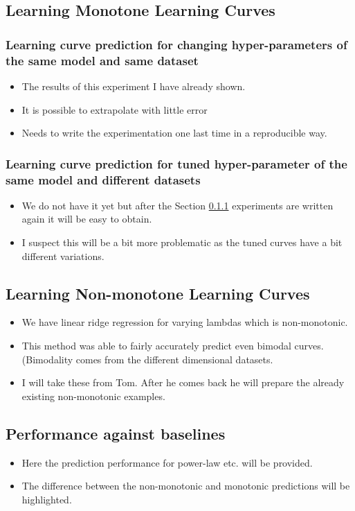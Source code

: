 \subsection{Learning Monotone Learning Curves}

\subsubsection{Learning curve prediction for changing hyper-parameters of the same model and same dataset}\label{sec:same}
\begin{itemize}
  \item The results of this experiment I have already shown. 
  \item It is possible to extrapolate with little error
  \item Needs to write the experimentation one last time in a reproducible way.
\end{itemize}
\subsubsection{Learning curve prediction for tuned hyper-parameter of the same model and different datasets}\label{sec:diff-dataset}
\begin{itemize}
  \item We do not have it yet but after the Section \ref{sec:same} experiments are written again it will be easy to obtain.
  \item I suspect this will be a bit more problematic as the tuned curves have a bit different variations.
\end{itemize}

\subsection{Learning Non-monotone Learning Curves}
\begin{itemize}
  \item We have linear ridge regression for varying lambdas which is non-monotonic.
  \item This method was able to fairly accurately predict even bimodal curves. (Bimodality comes from the different dimensional datasets.
  \item I will take these from Tom. After he comes back he will prepare the already existing non-monotonic examples.
\end{itemize}

\subsection{Performance against baselines}
\begin{itemize}
  \item Here the prediction performance for power-law etc. will be provided.
  \item The difference between the non-monotonic and monotonic predictions will be highlighted.
\end{itemize}


